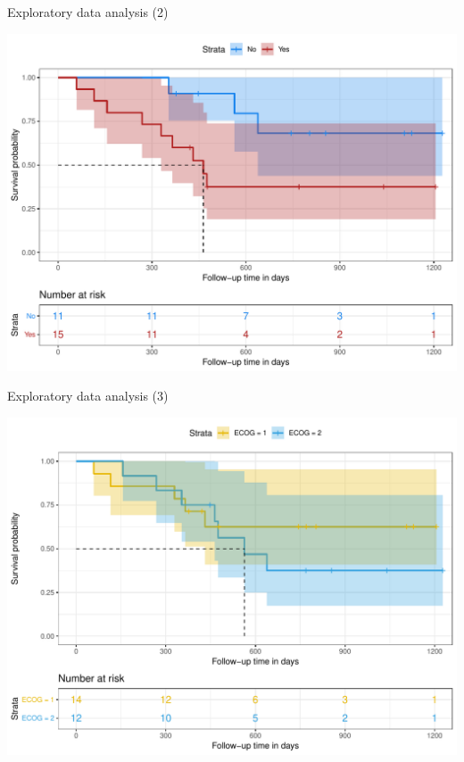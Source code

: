 \documentclass[ignorenonframetext,a4paper]{beamer}
\begin{document}
\begin{frame}{Exploratory data analysis (2)}

\includegraphics{DB_presentation_case_study_files/figure-beamer/unnamed-chunk-4-1.pdf}

\end{frame}

\begin{frame}{Exploratory data analysis (3)}

\includegraphics{DB_presentation_case_study_files/figure-beamer/unnamed-chunk-5-1.pdf}

\end{frame}
\end{document}
